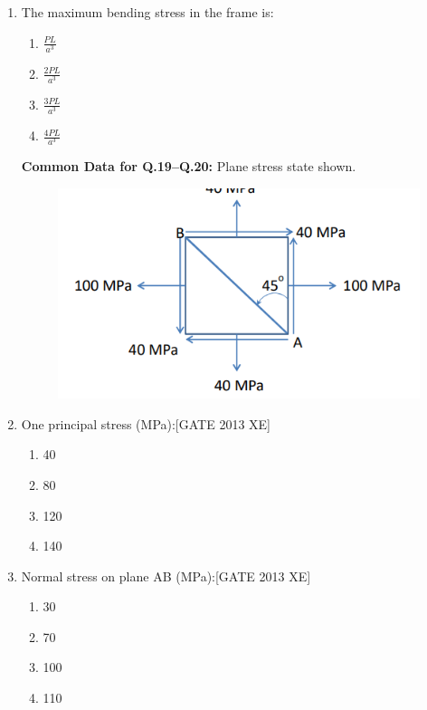 \documentclass[journal,12pt,onecolumn]{IEEEtran}
\theoremstyle{remark}
\begin{document}
\begin{enumerate}
\item The maximum bending stress in the frame is:

\begin{multicols}{2}
\begin{enumerate}
\item $\frac{P L}{a^3}$
\item $\frac{2P L}{a^3}$
\item $\frac{3P L}{a^3}$
\item $\frac{4P L}{a^3}$
\end{enumerate}
\end{multicols}



 \textbf{Common Data for Q.19–Q.20:} Plane stress state shown.

\begin{figure}[H]
    \centering
    \includegraphics[width=0.5\columnwidth]{figs/fig23.png}
    \caption{}
    \label{fig:fig23}
\end{figure}
 
 \item One principal stress (MPa):\hfill[GATE 2013 XE]  
\begin{multicols}{4}
\begin{enumerate}
\item 40
\item 80
\item 120
\item 140
\end{enumerate}
\end{multicols}

\item Normal stress on plane AB (MPa):\hfill[GATE 2013 XE]  
\begin{multicols}{4}
\begin{enumerate}
\item 30
\item 70
\item 100
\item 110
\end{enumerate}
\end{multicols}


\end{enumerate}
\end{document}
